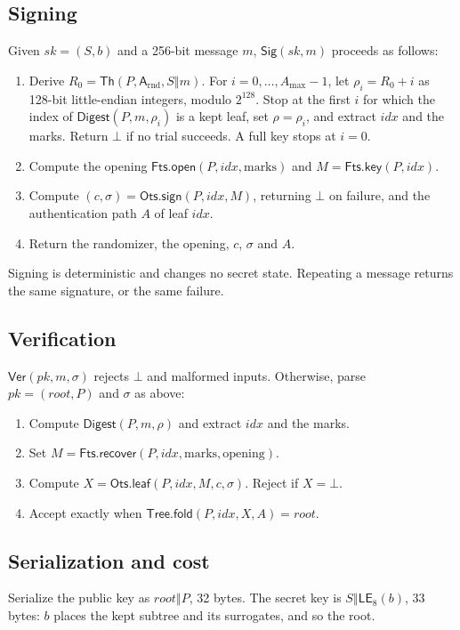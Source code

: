 \documentclass[11pt]{article}
\theoremstyle{plain}
\theoremstyle{definition}
\newcommand{\Th}{\mathsf{Th}}
\newcommand{\Digest}{\mathsf{Digest}}
\newcommand{\Sig}{\mathsf{Sig}}
\newcommand{\Ver}{\mathsf{Ver}}
\newcommand{\LE}{\mathsf{LE}}
\newcommand{\concat}{\mathbin\Vert}
\newcommand{\sk}{\mathit{sk}}
\newcommand{\pk}{\mathit{pk}}
\newcommand{\rootnode}{\mathit{root}}
\newcommand{\addr}{\mathsf{A}}
\newcommand{\amax}{A_{\max}}
\newcommand{\idx}{\mathit{idx}}
\newcommand{\OtsSign}{\mathsf{Ots.sign}}
\newcommand{\OtsLeaf}{\mathsf{Ots.leaf}}
\newcommand{\TreeFold}{\mathsf{Tree.fold}}
\newcommand{\FtsKey}{\mathsf{Fts.key}}
\newcommand{\FtsOpen}{\mathsf{Fts.open}}
\newcommand{\FtsRec}{\mathsf{Fts.recover}}
\begin{document}
\subsection{Signing}
\label{sec:sign}

Given $\sk=(S,b)$ and a 256-bit message $m$, $\Sig(\sk,m)$ proceeds as follows:
\begin{enumerate}
\item Derive $R_0=\Th(P,\addr_{\mathrm{rnd}},S\concat m)$. For $i=0,\ldots,\amax-1$, let $\rho_i=R_0+i$ as 128-bit little-endian integers, modulo $2^{128}$. Stop at the first $i$ for which the index of $\Digest(P,m,\rho_i)$ is a kept leaf, set $\rho=\rho_i$, and extract $\idx$ and the marks. Return $\bot$ if no trial succeeds. A full key stops at $i=0$.
\item Compute the opening $\FtsOpen(P,\idx,\text{marks})$ and $M=\FtsKey(P,\idx)$.
\item Compute $(c,\sigma)=\OtsSign(P,\idx,M)$, returning $\bot$ on failure, and the authentication path $A$ of leaf $\idx$.
\item Return the randomizer, the opening, $c$, $\sigma$ and $A$.
\end{enumerate}
Signing is deterministic and changes no secret state. Repeating a message returns the same signature, or the same failure.

\subsection{Verification}
\label{sec:ver}

$\Ver(\pk,m,\sigma)$ rejects $\bot$ and malformed inputs. Otherwise, parse $\pk=(\rootnode,P)$ and $\sigma$ as above:
\begin{enumerate}
\item Compute $\Digest(P,m,\rho)$ and extract $\idx$ and the marks.
\item Set $M=\FtsRec(P,\idx,\text{marks},\text{opening})$.
\item Compute $X=\OtsLeaf(P,\idx,M,c,\sigma)$. Reject if $X=\bot$.
\item Accept exactly when $\TreeFold(P,\idx,X,A)=\rootnode$.
\end{enumerate}

\subsection{Serialization and cost}
\label{sec:costs}

Serialize the public key as $\rootnode\concat P$, 32 bytes. The secret key is $S\concat\LE_8(b)$, 33 bytes: $b$ places the kept subtree and its surrogates, and so the root.
\end{document}
